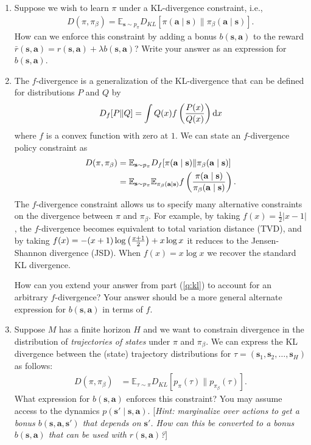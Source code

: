 \documentclass{article}
\def\s{\mathbf{s}}
\def\a{\mathbf{a}}
\def\E{\mathbb{E}}
\def\pib{\pi_{\beta}}
\begin{document}
\begin{enumerate}

	\item\label{q:kl} Suppose we wish to learn $\pi$ under a KL-divergence constraint, i.e., 
	\begin{align*}
		D(\pi,\pib)=\E_{\s\sim p_\pi}D_{KL}[\pi(\a\mid\s)\|\pib(\a\mid\s)].
	\end{align*}
	How can we enforce this constraint by adding a bonus $b(\s,\a)$ to the reward $\bar r(\s,\a)=r(\s,\a)+\lambda b(\s,\a)$? Write your answer as an expression for $b(\s,\a)$.
	
    \begin{sol}
    \end{sol}

	\item The $f$-divergence is a generalization of the KL-divergence that can be defined for distributions $P$ and $Q$ by $$D_f[P\|Q]=\int Q(x)f\left(P(x) \over Q(x)\right)\mathrm dx$$ where $f$ is a convex function with zero at $1$. We can state an $f$-divergence policy constraint as 
	\begin{align*}
	    D(\pi,\pib)&=\E_{\s\sim p_\pi}D_{f}[\pi(\a\mid\s)\|\pib(\a\mid\s)]\\
	    &= \E_{\s\sim p_\pi}\E_{\pib(\a\mid\s)}f\left(\pi(\a\mid\s)\over\pib(\a\mid\s)\right).
   	\end{align*}
   	The $f$-divergence constraint allows us to specify many alternative constraints on the divergence between $\pi$ and $\pib$. For example, by taking $f(x)=\frac12|x-1|$, the $f$-divergence becomes equivalent to total variation distance (TVD), and by taking $f(x)=-(x+1)\log\left(x+1\over2\right)+x\log x$ it reduces to the Jensen-Shannon divergence (JSD). When $f(x)=x\log x$ we recover the standard KL divergence.
   	
   	How can you extend your answer from part (\ref{q:kl}) to account for an arbitrary $f$-divergence? Your answer should be a more general alternate expression for $b(\s,\a)$ in terms of $f$.
	
    \begin{sol}
    \end{sol}

    \item Suppose $M$ has a finite horizon $H$ and we want to constrain divergence in the distribution of \emph{trajectories of states} under $\pi$ and $\pib$. We can express the KL divergence between the (state) trajectory distributions for $\tau=(\s_1,\s_2,\ldots,\s_H)$ as follows:
	\begin{align*}
	    D(\pi,\pib)&=\E_{\tau\sim\pi}D_{KL}[p_{\pi}(\tau)\|p_{\pib}(\tau)].
   	\end{align*} 
   	What expression for $b(\s,\a)$ enforces this constraint? You may assume access to the dynamics $p(\s'\mid\s,\a)$. [\emph{Hint: marginalize over actions to get a bonus $b(\s,\a,\s')$ that depends on $\s'$. How can this be converted to a bonus $b(\s,\a)$ that can be used with $r(\s,\a)$?}]

    \begin{sol}
    \end{sol}
\end{enumerate}
\end{document}
